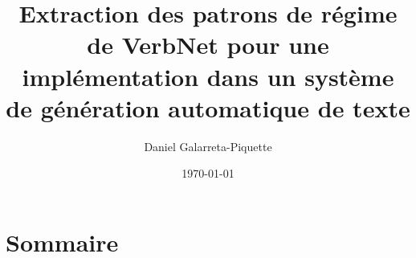 \documentclass[12pt,maitrise,frenchb,natbib,twoside,initial]{dms}
\numberwithin{equation}{section}
\numberwithin{table}{chapter}
\numberwithin{figure}{chapter}
\begin{document}


\title{Extraction des patrons de régime de VerbNet pour une implémentation dans un système de génération automatique de texte}
\author{Daniel Galarreta-Piquette}
\date{\today}									%




\maketitle    
 
\chapter*{Sommaire} 	%
\end{document}
